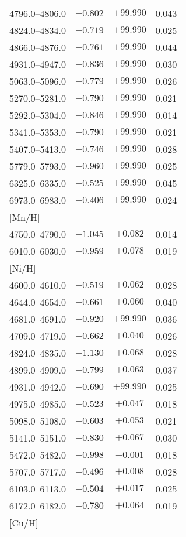 \documentclass{aa}
\begin{document}
\begin{appendix}
\begin{table}
{\begin{tabular}{lccc}
4796.0--4806.0 & $-0.802$ & $+99.990$ & 0.043\\
4824.0--4834.0 & $-0.719$ & $+99.990$ & 0.025\\
4866.0--4876.0 & $-0.761$ & $+99.990$ & 0.044\\
4931.0--4947.0 & $-0.836$ & $+99.990$ & 0.030\\
5063.0--5096.0 & $-0.779$ & $+99.990$ & 0.026\\
5270.0--5281.0 & $-0.790$ & $+99.990$ & 0.021\\
5292.0--5304.0 & $-0.846$ & $+99.990$ & 0.014\\
5341.0--5353.0 & $-0.790$ & $+99.990$ & 0.021\\
5407.0--5413.0 & $-0.746$ & $+99.990$ & 0.028\\
5779.0--5793.0 & $-0.960$ & $+99.990$ & 0.025\\
6325.0--6335.0 & $-0.525$ & $+99.990$ & 0.045\\
6973.0--6983.0 & $-0.406$ & $+99.990$ & 0.024\\
\mbox{[Mn/H]} \\
4750.0--4790.0 & $-1.045$ & $+0.082$ & 0.014\\
6010.0--6030.0 & $-0.959$ & $+0.078$ & 0.019\\
\mbox{[Ni/H]} \\
4600.0--4610.0 & $-0.519$ & $+0.062$ & 0.028\\
4644.0--4654.0 & $-0.661$ & $+0.060$ & 0.040\\
4681.0--4691.0 & $-0.920$ & $+99.990$ & 0.036\\
4709.0--4719.0 & $-0.662$ & $+0.040$ & 0.026\\
4824.0--4835.0 & $-1.130$ & $+0.068$ & 0.028\\
4899.0--4909.0 & $-0.799$ & $+0.063$ & 0.037\\
4931.0--4942.0 & $-0.690$ & $+99.990$ & 0.025\\
4975.0--4985.0 & $-0.523$ & $+0.047$ & 0.018\\
5098.0--5108.0 & $-0.603$ & $+0.053$ & 0.021\\
5141.0--5151.0 & $-0.830$ & $+0.067$ & 0.030\\
5472.0--5482.0 & $-0.998$ & $-0.001$ & 0.018\\
5707.0--5717.0 & $-0.496$ & $+0.008$ & 0.028\\
6103.0--6113.0 & $-0.504$ & $+0.017$ & 0.025\\
6172.0--6182.0 & $-0.780$ & $+0.064$ & 0.019\\
\mbox{[Cu/H]} \\

\end{tabular}}
\end{table}
\end{appendix}
\end{document}

